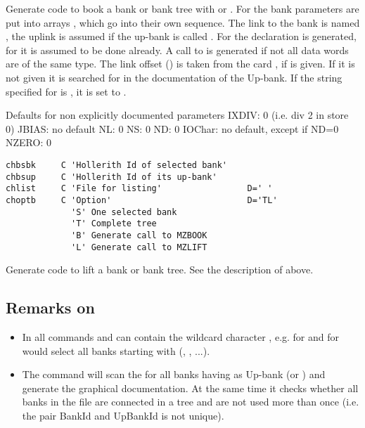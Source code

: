\begin{minipage}{\textwidth}
Generate code to book a bank or bank tree with 
or .
For  the bank parameters are put into arrays
, which go into their own  sequence.
The link to the bank  is named , 
the uplink is assumed  if the up-bank is called .
For  the declaration  is generated, 
for  it is assumed to be done already. 
A call to  is generated if not all data
words are of the same type.
The link offset () is taken from the card , 
if  is given. 
If it is not given it is searched for in the documentation of the Up-bank. 
If the string specified for  is ,
it is set to .
 
\begin{XMPt}{Defaults for non explicitly documented parameters}
  IXDIV:  0 (i.e. div 2 in store 0)
  JBIAS:  no default
  NL:     0    NS:     0    ND:     0
  IOChar: no default, except if ND=0
  NZERO:  0
\end{XMPt}
\end{minipage}
 
\newpage

 
\begin{verbatim}
chbsbk     C 'Hollerith Id of selected bank'
chbsup     C 'Hollerith Id of its up-bank'
chlist     C 'File for listing'                 D=' '
choptb     C 'Option'                           D='TL'
             'S' One selected bank
             'T' Complete tree
             'B' Generate call to MZBOOK
             'L' Generate call to MZLIFT
\end{verbatim}
 
Generate code to lift a bank or bank tree.
See the description of  above.
 
\subsection*{Remarks on }
 
\begin{itemize}
\item In all  commands  and  can contain 
      the wildcard character \Lit{*}, e.g.  for  
      and  for  would select all banks starting
      with  (, , ...). 
\item The command  will scan the \RZfile{}
      for all banks having as Up-bank  (or ) 
      and generate the graphical documentation. 
      At the same time it checks whether all banks in the file are connected 
      in a tree and are not used more than once
      (i.e. the pair BankId  and UpBankId is not unique).
\end{itemize}
 
